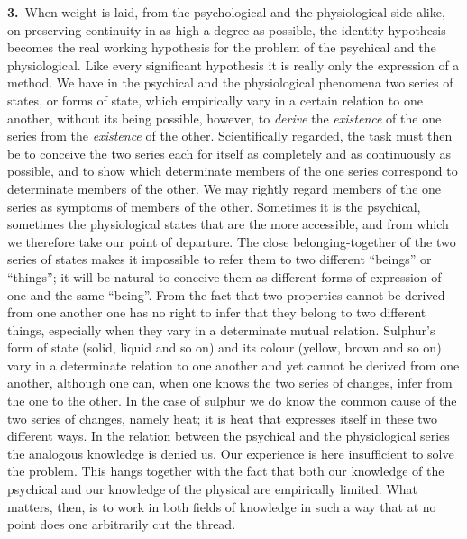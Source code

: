 \documentclass[12pt,a4paper]{book}
\newcommand{\opage}[1]{\marginnote{\footnotesize\textit{[#1]}}}
\begin{document}
\noindent\textbf{\opage{22}3.}~When weight is laid, from the psychological and the
physiological side alike, on preserving continuity in as high a degree as
possible, the identity hypothesis becomes the real working hypothesis for the
problem of the psychical and the physiological. Like every significant
hypothesis it is really only the expression of a method. We have in the
psychical and the physiological phenomena two series of states, or forms of
state, which empirically vary in a certain relation to one another, without its
being possible, however, to \emph{derive} the \emph{existence} of the one series
from the \emph{existence} of the other. Scientifically regarded, the task must
then be to conceive the two series each for itself as completely and as
continuously as possible, and to show which determinate members of the one
series correspond to determinate members of the other. We may rightly regard
members of the one series as symptoms of members of the other. Sometimes it is
the psychical, sometimes the physiological states that are the more accessible,
and from which we therefore take our point of departure. The close
belonging-together of the two series of states makes it impossible to refer them
to two different ``beings'' or ``things''; it will be natural to conceive them
as different forms of expression of one and the same ``being''. From the fact
that two properties cannot be derived from one another one has no right to
infer that they belong to two different things, especially when they vary in a
determinate mutual relation. Sulphur's form of state (solid, liquid and so on)
and its colour (yellow, brown and so on) vary in a determinate relation to one
another and yet cannot be derived from one another, although one can, when one
knows the two series of changes, infer from the one to the other. In the case of
sulphur we do know the common cause of the two series of changes, namely heat;
it is heat that expresses itself in these two different ways. In the relation
between the psychical and the physiological series the analogous knowledge is
denied us. Our experience is here insufficient to solve the problem. This hangs
together with the fact that both our knowledge of the psychical and our
knowledge of the physical are empirically limited. What matters, then, is to
work in both fields of knowledge in such a way that at no point does one
arbitrarily cut the thread.
\end{document}
